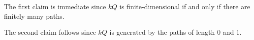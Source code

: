 The first claim is immediate since $kQ$ is finite-dimensional if and only if
there are finitely many paths.

The second claim follows since $kQ$ is generated by the paths of length $0$ and $1$.
